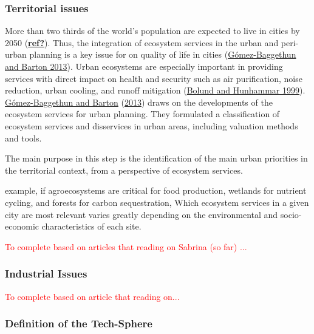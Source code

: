 \documentclass[
  14pt,
]{extarticle}
\begin{document}
\hypertarget{territorial-issues}{%
\subsubsection{Territorial issues}\label{territorial-issues}}

More than two thirds of the world's population are expected to live in cities by 2050 (\protect\hyperlink{ref-ref}{\textbf{ref?}}). Thus, the integration of ecosystem services in the urban and peri-urban planning is a key issue for on quality of life in cities (\protect\hyperlink{ref-Gomez-Baggethun2013}{Gómez-Baggethun and Barton 2013}).
Urban ecosystems are especially important in providing services with direct impact on health and security such as air purification, noise reduction, urban
cooling, and runoff mitigation (\protect\hyperlink{ref-Bolund1999}{Bolund and Hunhammar 1999}).
\protect\hyperlink{ref-Gomez-Baggethun2013}{Gómez-Baggethun and Barton} (\protect\hyperlink{ref-Gomez-Baggethun2013}{2013}) draws on the developments of the ecosystem services for urban planning.
They formulated a classification of ecosystem services and disservices in urban areas, including valuation methods and tools.

The main purpose in this step is the identification of the main urban priorities in the territorial context, from a perspective of ecosystem services.

example, if agroecosystems are critical for food production, wetlands for nutrient cycling, and forests for carbon sequestration,
Which ecosystem services in a given city are most relevant varies greatly depending on the environmental and socio-economic characteristics of each site.

\textcolor{red}{ To complete based on articles that reading on Sabrina (so far) ...}

\hypertarget{industrial-issues}{%
\subsubsection{Industrial Issues}\label{industrial-issues}}

\textcolor{red}{ To complete based on article that reading on...}

\hypertarget{definition-of-the-tech-sphere}{%
\subsubsection{Definition of the Tech-Sphere}\label{definition-of-the-tech-sphere}}
\end{document}
